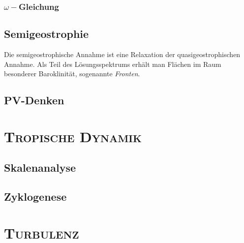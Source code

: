 \documentclass{book}
\begin{document}
\subsection{$\omega-$Gleichung}
\label{sec:omegagleichung}

\section{Semigeostrophie}
\label{sec:semigeostrophie}

Die semigeostrophische Annahme ist eine Relaxation der quasigeostrophischen Annahme. Als Teil des Lösungsspektrums erhält man Flächen im Raum besonderer Baroklinität, sogenannte \textit{Fronten}.

\section{PV-Denken}
\label{sec:pv-denken}

\chapter{\normalfont\textsc{Tropische Dynamik}}
\label{chap:tropische_dynamik}

\section{Skalenanalyse}
\label{sec:skalenanalyse}

\section{Zyklogenese}
\label{sec:zyklogenese}

\chapter{\normalfont\textsc{Turbulenz}}
\label{chap:turbulenz}
\end{document}
